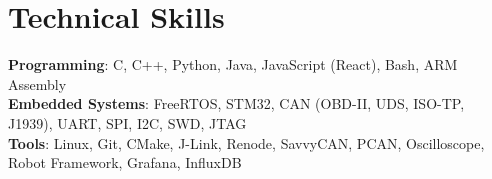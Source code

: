 \documentclass[letterpaper,11pt]{article}
\makeatletter
\newcommand{\resumeItem}[1]{
  \item\small{
    {#1\vspace{-2pt}}
  }
}
\newcommand{\resumeProjectHeading}[2]{
    \item
    \begin{tabular*}{0.97\textwidth}{l@{\extracolsep{\fill}}r}
      \small#1 & #2 \\
    \end{tabular*}\vspace{-7pt}
}
\newcommand{\resumeSubHeadingListEnd}{\end{itemize}}
\newcommand{\resumeItemListStart}{\begin{itemize}}
\newcommand{\resumeItemListEnd}{\end{itemize}\vspace{-5pt}}
\makeatother
\begin{document}

          
    \section{Technical Skills}
    \begin{itemize}[leftmargin=0.15in, label={}]
    \small{\item{
        \textbf{Programming}{: C, C++, Python, Java, JavaScript (React), Bash, ARM Assembly} \\
        \textbf{Embedded Systems}{: FreeRTOS, STM32, CAN (OBD-II, UDS, ISO-TP, J1939), UART, SPI, I2C, SWD, JTAG}\\
        \textbf{Tools}{: Linux, Git, CMake, J-Link, Renode, SavvyCAN, PCAN, Oscilloscope, Robot Framework, Grafana, InfluxDB} \\
        }}
    \end{itemize}


\end{document}
